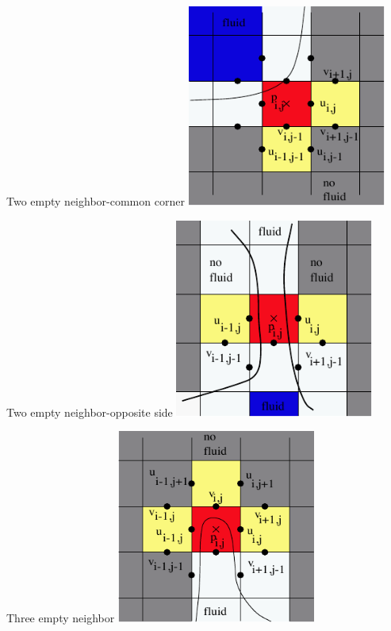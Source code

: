\documentclass{beamer}
\begin{document}
	\begin{frame}{Two empty neighbor-common corner}
			\includegraphics[width=0.49\textwidth]{pic/two1.pdf}

	\end{frame}	
	
	\begin{frame}{Two empty neighbor-opposite side}
			\includegraphics[width=0.49\textwidth]{pic/two2.pdf}

	\end{frame}	
	
	\begin{frame}{Three empty neighbor}
			\includegraphics[width=0.49\textwidth]{pic/three.pdf}
	\end{frame}	
		
\end{document}
